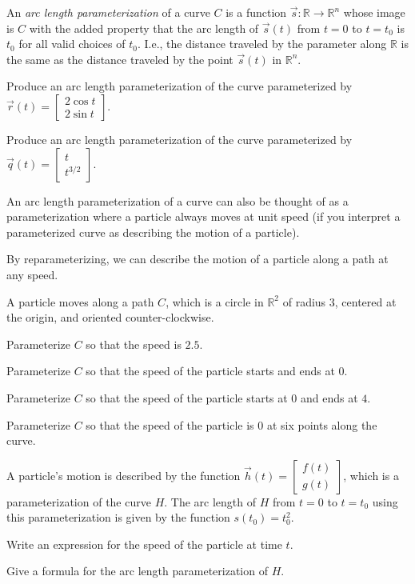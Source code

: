 \documentclass{problemset}
\newcommand{\R}{\mathbb{R}}
\newcommand{\mat}[1]{\begin{bmatrix}#1\end{bmatrix}}
\begin{document}
	An \emph{arc length parameterization} of a curve $C$ is a function $\vec s:\R\to\R^n$ whose
	image is $C$ with the added property that the arc length of $\vec s(t)$ from $t=0$ to $t=t_0$
	is $t_0$ for all valid choices of $t_0$.  I.e., the distance traveled by the parameter along
	$\R$ is the same as the distance traveled by the point $\vec s(t)$ in $\R^n$.

	\question
	\begin{parts}
		\item Produce an arc length parameterization of the curve parameterized by
			$
				\vec r(t) =\mat{2\cos t\\ 2\sin t}.
			$
		\item Produce an arc length parameterization of the curve parameterized by
			$
				\vec q(t) =\mat{t\\ t^{3/2}}.
			$
	\end{parts}

	
	An arc length parameterization of a curve can also be thought of
	as a parameterization where a particle always moves at unit speed 
	(if you interpret a parameterized curve as describing the motion of a
	particle).

	By reparameterizing, we can describe the motion of a particle along
	a path at any speed.

	\question
	A particle moves along a path $C$, which is a circle in $\R^2$ of radius $3$, centered at the origin, and oriented counter-clockwise.
	\begin{parts}
		\item Parameterize $C$ so that the speed is $2.5$.
		\item Parameterize $C$ so that the speed of the particle starts and ends at $0$.
		\item Parameterize $C$ so that the speed of the particle starts at $0$ and ends at $4$.
		\item Parameterize $C$ so that the speed of the particle is $0$ at six points along the curve.
	\end{parts}

	\question
	A particle's motion is described by the function $\vec h(t) = \mat{f(t)\\ g(t)}$,  which is a 
	parameterization of the curve $H$.  The arc length of $H$ from $t=0$ to
	$t=t_0$ using this parameterization is given by the function $s(t_0) = t_0^2$.
	\begin{parts}
		\item Write an expression for the speed of the particle at time $t$.
		\item Give a formula for the arc length parameterization of $H$.
	\end{parts}
\end{document}
